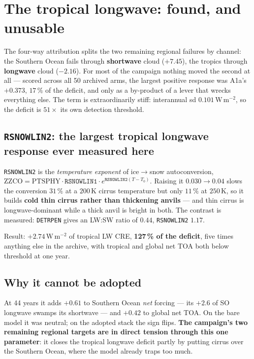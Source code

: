 \documentclass[10pt]{article}
\begin{document}
\section{The tropical longwave: found, and unusable}\label{sec:troplw}

The four-way attribution splits the two remaining regional failures by channel: the
Southern Ocean fails through \textbf{shortwave} cloud ($+7.45$), the tropics through
\textbf{longwave} cloud ($-2.16$). For most of the campaign nothing moved the second at
all --- scored across all 50 archived arms, the largest positive response was A1a's
$+0.373$, $17\,\%$ of the deficit, and only as a by-product of a lever that wrecks
everything else. The term is extraordinarily stiff: interannual sd $0.101$\,W\,m$^{-2}$, so
the deficit is $51\times$ its own detection threshold.

\subsection{\texttt{RSNOWLIN2}: the largest tropical longwave response ever measured here}
\texttt{RSNOWLIN2} is the \emph{temperature exponent} of ice$\to$snow autoconversion,
$\mathrm{ZZCO}=\mathrm{PTSPHY}\cdot\mathtt{RSNOWLIN1}\cdot e^{\mathtt{RSNOWLIN2}(T-T_0)}$.
Raising it $0.030\to0.04$ slows the conversion $31\,\%$ at a $200$\,K cirrus temperature but
only $11\,\%$ at $250$\,K, so it builds \textbf{cold thin cirrus rather than thickening
anvils} --- and thin cirrus is longwave-dominant while a thick anvil is bright in both. The
contrast is measured: \texttt{DETRPEN} gives an LW:SW ratio of $0.44$, \texttt{RSNOWLIN2}
$1.17$.

Result: $+2.74$\,W\,m$^{-2}$ of tropical LW CRE, \textbf{127\,\% of the deficit}, five times
anything else in the archive, with tropical and global net TOA both below threshold at one
year.

\subsection{Why it cannot be adopted}
At 44 years it adds $+0.61$ to Southern Ocean \emph{net} forcing --- its $+2.6$ of SO
longwave swamps its shortwave --- and $+0.42$ to global net TOA. On the bare model it was
neutral; on the adopted stack the sign flips. \textbf{The campaign's two remaining regional
targets are in direct tension through this one parameter}: it closes the tropical longwave
deficit partly by putting cirrus over the Southern Ocean, where the model already traps too
much.
\end{document}
